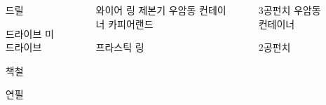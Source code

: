 \documentclass[20pt, a1paper ]{tikzposter}
\begin{document}
\begin{columns}
{		}		




		{
			\setlength{\leftmargini}{7em}			
			\setlength{\labelsep}{1em} %

			\begin{LARGE}
			\begin{itemize}
			\item [드릴]
			\item [드라이브] 미 드라이브 
			\item [책철] 
			\item [연필] 
			\end{itemize}
			\end{LARGE}

		}



			{				
			\setlength{\leftmargini}{12em}
			\setlength{\labelsep}{1em} %

			\begin{LARGE}
			\begin{itemize}
			\item [와이어 링 제본기] 우암동 컨테이너 카피어랜드 
			\item [프라스틱 링]
			\end{itemize}
			\end{LARGE}
		}

			{				
			\setlength{\leftmargini}{12em}
			\setlength{\labelsep}{1em} %

			\begin{LARGE}
			\begin{itemize}
			\item [3공펀치] 우암동 컨테이너 
			\item [2공펀치]
			\end{itemize}
			\end{LARGE}
		}


\end{columns}
\end{document}
